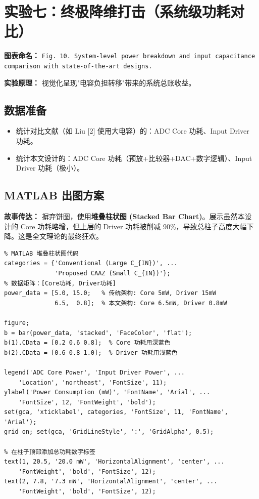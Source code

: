 \documentclass[11pt,a4paper,UTF8]{ctexart}
\begin{document}
\section{实验七：终极降维打击（系统级功耗对比）}

\textbf{图表命名：} \texttt{Fig. 10. System-level power breakdown and input capacitance comparison with state-of-the-art designs.}

\textbf{实验原理：} 视觉化呈现"电容负担转移"带来的系统总账收益。

\subsection{数据准备}

\begin{itemize}[leftmargin=*]
    \item 统计对比文献（如 Liu [2] 使用大电容）的：ADC Core 功耗、Input Driver 功耗。
    \item 统计本文设计的：ADC Core 功耗（预放+比较器+DAC+数字逻辑）、Input Driver 功耗（极小）。
\end{itemize}

\subsection{MATLAB 出图方案}

\textbf{故事传达：} 摒弃饼图，使用\textbf{堆叠柱状图 (Stacked Bar Chart)}。展示虽然本设计的 Core 功耗略增，但上层的 Driver 功耗被削减 90\%，导致总柱子高度大幅下降。这是全文理论的最终狂欢。

\begin{lstlisting}
% MATLAB 堆叠柱状图代码
categories = {'Conventional (Large C_{IN})', ...
              'Proposed CAAZ (Small C_{IN})'};
% 数据矩阵：[Core功耗, Driver功耗]
power_data = [5.0, 15.0;   % 传统架构: Core 5mW, Driver 15mW
              6.5,  0.8];  % 本文架构: Core 6.5mW, Driver 0.8mW

figure;
b = bar(power_data, 'stacked', 'FaceColor', 'flat');
b(1).CData = [0.2 0.6 0.8];  % Core 功耗用深蓝色
b(2).CData = [0.6 0.8 1.0];  % Driver 功耗用浅蓝色

legend('ADC Core Power', 'Input Driver Power', ...
    'Location', 'northeast', 'FontSize', 11);
ylabel('Power Consumption (mW)', 'FontName', 'Arial', ...
    'FontSize', 12, 'FontWeight', 'bold');
set(gca, 'xticklabel', categories, 'FontSize', 11, 'FontName', 'Arial');
grid on; set(gca, 'GridLineStyle', ':', 'GridAlpha', 0.5);

% 在柱子顶部添加总功耗数字标签
text(1, 20.5, '20.0 mW', 'HorizontalAlignment', 'center', ...
    'FontWeight', 'bold', 'FontSize', 12);
text(2, 7.8, '7.3 mW', 'HorizontalAlignment', 'center', ...
    'FontWeight', 'bold', 'FontSize', 12);
\end{lstlisting}
\end{document}
